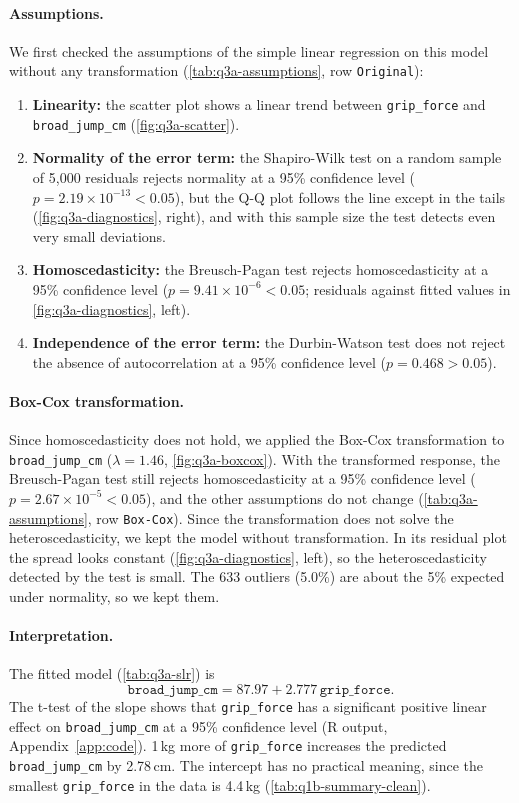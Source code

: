 \paragraph{Assumptions.}
We first checked the assumptions of the simple linear regression on this model without any transformation (\autoref{tab:q3a-assumptions}, row \texttt{Original}):
\begin{enumerate}
  \item \textbf{Linearity:} the scatter plot shows a linear trend between \texttt{grip\_force} and \texttt{broad\_jump\_cm} (\autoref{fig:q3a-scatter}).
  \item \textbf{Normality of the error term:} the Shapiro-Wilk test on a random sample of 5,000 residuals rejects normality at a 95\% confidence level ($p = 2.19 \times 10^{-13} < 0.05$), but the Q-Q plot follows the line except in the tails (\autoref{fig:q3a-diagnostics}, right), and with this sample size the test detects even very small deviations.
  \item \textbf{Homoscedasticity:} the Breusch-Pagan test rejects homoscedasticity at a 95\% confidence level ($p = 9.41 \times 10^{-6} < 0.05$; residuals against fitted values in \autoref{fig:q3a-diagnostics}, left).
  \item \textbf{Independence of the error term:} the Durbin-Watson test does not reject the absence of autocorrelation at a 95\% confidence level ($p = 0.468 > 0.05$).
\end{enumerate}

\paragraph{Box-Cox transformation.}
Since homoscedasticity does not hold, we applied the Box-Cox transformation to \texttt{broad\_jump\_cm} ($\lambda = 1.46$, \autoref{fig:q3a-boxcox}).
With the transformed response, the Breusch-Pagan test still rejects homoscedasticity at a 95\% confidence level ($p = 2.67 \times 10^{-5} < 0.05$), and the other assumptions do not change (\autoref{tab:q3a-assumptions}, row \texttt{Box-Cox}).
Since the transformation does not solve the heteroscedasticity, we kept the model without transformation.
In its residual plot the spread looks constant (\autoref{fig:q3a-diagnostics}, left), so the heteroscedasticity detected by the test is small.
The 633 outliers (5.0\%) are about the 5\% expected under normality, so we kept them.

\paragraph{Interpretation.}
The fitted model (\autoref{tab:q3a-slr}) is
\[
  \texttt{broad\_jump\_cm} = 87.97 + 2.777\,\texttt{grip\_force}.
\]
The t-test of the slope shows that \texttt{grip\_force} has a significant positive linear effect on \texttt{broad\_jump\_cm} at a 95\% confidence level (R output, Appendix~\ref{app:code}).
1\,kg more of \texttt{grip\_force} increases the predicted \texttt{broad\_jump\_cm} by 2.78\,cm.
The intercept has no practical meaning, since the smallest \texttt{grip\_force} in the data is 4.4\,kg (\autoref{tab:q1b-summary-clean}).

